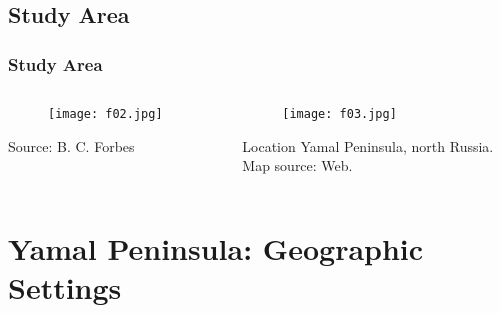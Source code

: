 \documentclass[pdflatex,compress,8pt,
	xcolor={dvipsnames,dvipsnames,svgnames,x11names,table},
	hyperref={colorlinks = true,
	breaklinks = true, 
	urlcolor = NavyBlue, 
	breaklinks = true}]{beamer}
\begin{document}
\subsection{Study Area}
\begin{frame}\frametitle{Study Area}
\begin{minipage}[0.4\textheight]{\textwidth}
\begin{columns}[T]
\begin{column}{0.5\textwidth}
\begin{figure}[H]
	\centering
		\texttt{[image: f02.jpg]}
\end{figure}
Source: B. C. Forbes
\end{column}
\begin{column}{0.5\textwidth}
\begin{figure}[H]
	\centering
		\texttt{[image: f03.jpg]}
\end{figure}

\begin{alertblock}{Location}
Yamal Peninsula, north Russia. \\
Map source: Web.
\end{alertblock}

\end{column}
\end{columns}
\end{minipage}
\end{frame}

\section{Yamal Peninsula: Geographic Settings}
\end{document}

